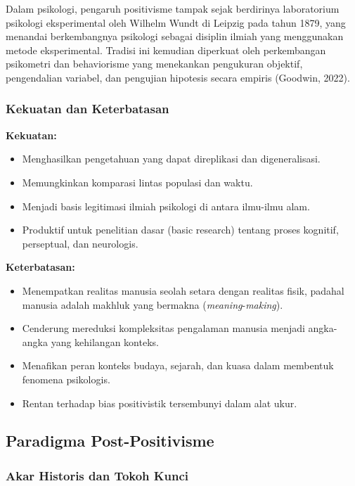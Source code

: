\documentclass[
  indonesian,
  letterpaper,
  DIV=11,
  numbers=noendperiod]{scrreprt}
\providecommand{\tightlist}{%
  \setlength{\itemsep}{0pt}\setlength{\parskip}{0pt}}
\begin{document}
Dalam psikologi, pengaruh positivisme tampak sejak berdirinya
laboratorium psikologi eksperimental oleh Wilhelm Wundt di Leipzig pada
tahun 1879, yang menandai berkembangnya psikologi sebagai disiplin
ilmiah yang menggunakan metode eksperimental. Tradisi ini kemudian
diperkuat oleh perkembangan psikometri dan behaviorisme yang menekankan
pengukuran objektif, pengendalian variabel, dan pengujian hipotesis
secara empiris (Goodwin, 2022).

\subsubsection{Kekuatan dan
Keterbatasan}\label{kekuatan-dan-keterbatasan}

\textbf{Kekuatan:}

\begin{itemize}
\tightlist
\item
  Menghasilkan pengetahuan yang dapat direplikasi dan digeneralisasi.
\item
  Memungkinkan komparasi lintas populasi dan waktu.
\item
  Menjadi basis legitimasi ilmiah psikologi di antara ilmu-ilmu alam.
\item
  Produktif untuk penelitian dasar (basic research) tentang proses
  kognitif, perseptual, dan neurologis.
\end{itemize}

\textbf{Keterbatasan:}

\begin{itemize}
\tightlist
\item
  Menempatkan realitas manusia seolah setara dengan realitas fisik,
  padahal manusia adalah makhluk yang bermakna
  (\emph{meaning}-\emph{making}).
\item
  Cenderung mereduksi kompleksitas pengalaman manusia menjadi
  angka-angka yang kehilangan konteks.
\item
  Menafikan peran konteks budaya, sejarah, dan kuasa dalam membentuk
  fenomena psikologis.
\item
  Rentan terhadap bias positivistik tersembunyi dalam alat ukur.
\end{itemize}

\subsection{Paradigma
Post-Positivisme}\label{paradigma-post-positivisme}

\subsubsection{Akar Historis dan Tokoh
Kunci}\label{akar-historis-dan-tokoh-kunci-1}
\end{document}
